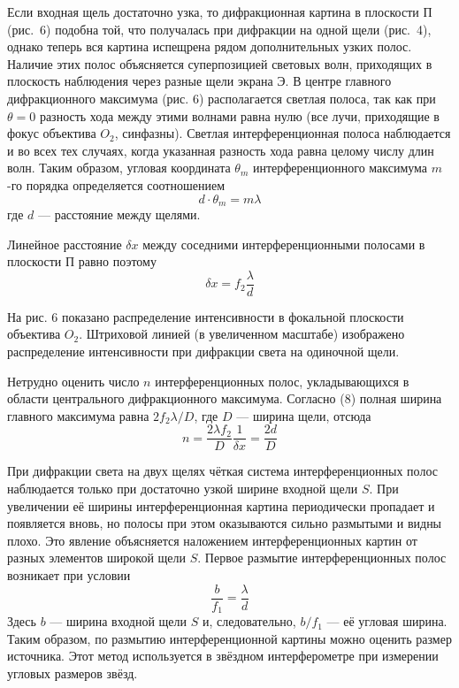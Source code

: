 \documentclass[a4paper, 12pt]{article}
\begin{document}
Если входная щель достаточно узка, то дифракционная картина в
плоскости П (рис.~6) подобна той, что получалась при дифракции на
одной щели (рис.~4), однако теперь вся картина испещрена рядом
дополнительных узких полос. Наличие этих полос объясняется
суперпозицией световых волн, приходящих в плоскость наблюдения через
разные щели экрана Э. В центре главного дифракционного максимума (рис. 6)
располагается светлая полоса, так как при $\theta = 0$ разность хода между
этими волнами равна нулю (все лучи, приходящие в фокус объектива $O_2$,
синфазны). Светлая интерференционная полоса наблюдается и во всех
тех случаях, когда указанная разность хода равна целому числу длин
волн. Таким образом, угловая координата $\theta_m$ интерференционного
максимума $m$-го порядка определяется соотношением
\begin{equation}
    d\cdot \theta_m = m \lambda
\end{equation}
где $d$ --- расстояние между щелями.

Линейное расстояние $\delta x$ между соседними интерференционными
полосами в плоскости П равно поэтому 
\begin{equation}
    \delta x = f_2 \frac{\lambda}{d}
\end{equation}

На рис. 6 показано распределение интенсивности в фокальной плоскости
объектива $O_2$. Штриховой линией (в увеличенном масштабе) изображено
распределение интенсивности при дифракции света на одиночной щели.

Нетрудно оценить число $n$ интерференционных полос, укладывающихся в
области центрального дифракционного максимума. Согласно (8) полная
ширина главного максимума равна $2f_2 \lambda/D$, где $D$ — ширина щели, отсюда
\begin{equation}
    n = \frac{2\lambda f_2}{D} \frac{1}{\delta x} = \frac{2d}{D}
\end{equation}

При дифракции света на двух щелях чёткая система интерференционных
полос наблюдается только при достаточно узкой ширине входной щели $S$.
При увеличении её ширины интерференционная картина периодически
пропадает и появляется вновь, но полосы при этом оказываются
сильно размытыми и видны плохо. Это явление объясняется наложением
интерференционных картин от разных элементов широкой щели $S$. Первое
размытие интерференционных полос возникает при условии
\begin{equation}
    \frac{b}{f_1} = \frac{\lambda}{d}
\end{equation}
Здесь $b$ — ширина входной щели $S$ и, следовательно, $b/f_1$ — её угловая
ширина. Таким образом, по размытию интерференционной картины можно
оценить размер источника. Этот метод используется в звёздном
интерферометре при измерении угловых размеров звёзд. 
\end{document}
